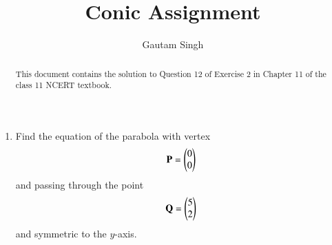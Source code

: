 \documentclass[journal,12pt,twocolumn]{IEEEtran}
\renewcommand{\vec}[1]{\boldsymbol{\mathbf{#1}}}
\begin{document}
\vspace{3cm}
\title{Conic Assignment}
\author{Gautam Singh}
\maketitle
\bigskip

\begin{abstract}
    This document contains the solution to Question 12 of Exercise 2 in Chapter
    11 of the class 11 NCERT textbook.
\end{abstract}

\begin{enumerate}
    \item Find the equation of the parabola with vertex
    \begin{align}
        \vec{P} = \myvec{0\\0}
    \end{align}
    and passing through the point
    \begin{align}
        \vec{Q} = \myvec{5\\2}
    \end{align}
    and symmetric to the $y$-axis.


\end{enumerate}
\end{document}
